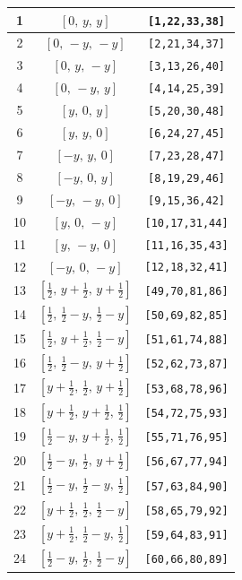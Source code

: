 \documentclass[fleqn,8pt]{jsarticle}
\begin{document}
\begin{longtable}{ccc}
1 & $\left[ 0,\, y,\, y \right]$ & {\tt [1,22,33,38]} \\ \hline
2 & $\left[ 0,\, - y,\, - y \right]$ & {\tt [2,21,34,37]} \\ \hline
3 & $\left[ 0,\, y,\, - y \right]$ & {\tt [3,13,26,40]} \\ \hline
4 & $\left[ 0,\, - y,\, y \right]$ & {\tt [4,14,25,39]} \\ \hline
5 & $\left[ y,\, 0,\, y \right]$ & {\tt [5,20,30,48]} \\ \hline
6 & $\left[ y,\, y,\, 0 \right]$ & {\tt [6,24,27,45]} \\ \hline
7 & $\left[ - y,\, y,\, 0 \right]$ & {\tt [7,23,28,47]} \\ \hline
8 & $\left[ - y,\, 0,\, y \right]$ & {\tt [8,19,29,46]} \\ \hline
9 & $\left[ - y,\, - y,\, 0 \right]$ & {\tt [9,15,36,42]} \\ \hline
10 & $\left[ y,\, 0,\, - y \right]$ & {\tt [10,17,31,44]} \\ \hline
11 & $\left[ y,\, - y,\, 0 \right]$ & {\tt [11,16,35,43]} \\ \hline
12 & $\left[ - y,\, 0,\, - y \right]$ & {\tt [12,18,32,41]} \\ \hline
13 & $\left[ \frac{1}{2},\, y + \frac{1}{2},\, y + \frac{1}{2} \right]$ & {\tt [49,70,81,86]} \\ \hline
14 & $\left[ \frac{1}{2},\, \frac{1}{2} - y,\, \frac{1}{2} - y \right]$ & {\tt [50,69,82,85]} \\ \hline
15 & $\left[ \frac{1}{2},\, y + \frac{1}{2},\, \frac{1}{2} - y \right]$ & {\tt [51,61,74,88]} \\ \hline
16 & $\left[ \frac{1}{2},\, \frac{1}{2} - y,\, y + \frac{1}{2} \right]$ & {\tt [52,62,73,87]} \\ \hline
17 & $\left[ y + \frac{1}{2},\, \frac{1}{2},\, y + \frac{1}{2} \right]$ & {\tt [53,68,78,96]} \\ \hline
18 & $\left[ y + \frac{1}{2},\, y + \frac{1}{2},\, \frac{1}{2} \right]$ & {\tt [54,72,75,93]} \\ \hline
19 & $\left[ \frac{1}{2} - y,\, y + \frac{1}{2},\, \frac{1}{2} \right]$ & {\tt [55,71,76,95]} \\ \hline
20 & $\left[ \frac{1}{2} - y,\, \frac{1}{2},\, y + \frac{1}{2} \right]$ & {\tt [56,67,77,94]} \\ \hline
21 & $\left[ \frac{1}{2} - y,\, \frac{1}{2} - y,\, \frac{1}{2} \right]$ & {\tt [57,63,84,90]} \\ \hline
22 & $\left[ y + \frac{1}{2},\, \frac{1}{2},\, \frac{1}{2} - y \right]$ & {\tt [58,65,79,92]} \\ \hline
23 & $\left[ y + \frac{1}{2},\, \frac{1}{2} - y,\, \frac{1}{2} \right]$ & {\tt [59,64,83,91]} \\ \hline
24 & $\left[ \frac{1}{2} - y,\, \frac{1}{2},\, \frac{1}{2} - y \right]$ & {\tt [60,66,80,89]} \\
\end{longtable}
\end{document}
